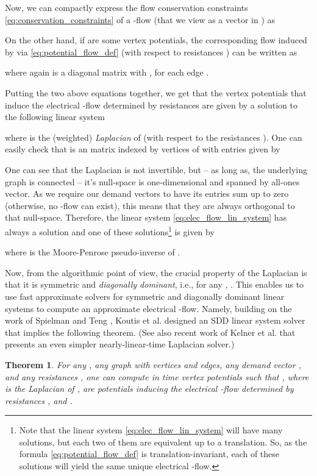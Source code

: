 \documentclass[11pt, letterpaper]{article}
\newtheorem{theorem}{Theorem}[section]
\begin{document}
Now, we can compactly express the flow conservation constraints \eqref{eq:conservation_constraints} of a -flow  (that we view as a vector in ) as


On the other hand, if  are some vertex potentials, the corresponding flow  induced by  via \eqref{eq:potential_flow_def} (with respect to resistances ) can be written as

where again  is a diagonal  matrix with , for each edge . 

Putting the two above equations together, we get that the vertex potentials  that induce the electrical -flow determined by resistances  are given by a  solution to the following linear system

where  is the (weighted) \emph{Laplacian } of  (with respect to the resistances ). One can easily check that  is an  matrix indexed by vertices of  with entries given by 



One can see that the Laplacian  is not invertible, but -- as long as, the underlying graph is connected -- it's null-space is one-dimensional and spanned by all-ones vector. As we require our demand vectors  to have its entries sum up to zero (otherwise, no -flow can exist), this means that they are always orthogonal to that null-space. Therefore, the linear system \eqref{eq:elec_flow_lin_system} has always a solution  and one of these solutions\footnote{Note that the linear system \eqref{eq:elec_flow_lin_system} will have many solutions, but each two of them are equivalent up to a translation. So, as the formula \eqref{eq:potential_flow_def} is translation-invariant, each of these solutions will yield the same unique electrical -flow.} is given by

where  is the Moore-Penrose pseudo-inverse of .

Now, from the algorithmic point of view, the crucial property of the Laplacian  is that it is symmetric and {\em diagonally dominant}, i.e., for any , . This enables us to use fast approximate solvers for symmetric and diagonally dominant linear systems to compute an approximate electrical -flow. Namely, building on the work of Spielman and Teng \cite{SpielmanT03,SpielmanTeng04}, Koutis et al. \cite{KoutisMP10,KoutisMP11} designed an SDD linear system solver that implies the following theorem. (See also recent work of Kelner et al. \cite{KelnerOSZ13} that presents an even simpler nearly-linear-time Laplacian solver.)


\begin{theorem}\label{thm:vanilla_SDD_solver}
For any , any graph  with  vertices and  edges, any demand vector , and any resistances , one can compute in  time vertex potentials  such that
, where  is the Laplacian of ,  are potentials inducing the electrical -flow determined by resistances , and .
\end{theorem}
\end{document}
